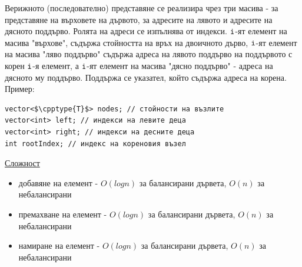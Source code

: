 \documentclass{article}
\begin{document}
Верижното (последователно) представяне се реализира чрез три масива - за представяне на върховете на
дървото, за адресите на лявото и адресите на дясното поддърво. Ролята на адреси се изпълнява от индекси. $\textcolor{black}{\texttt{i}}$-ят елемент на
масива "върхове", съдържа стойността на връх на двоичното дърво, $\textcolor{black}{\texttt{i}}$-ят елемент на масива "ляво поддърво" съдържа адреса на
лявото поддърво на поддървото с корен $\textcolor{black}{\texttt{i}}$-я елемент, а $\textcolor{black}{\texttt{i}}$-ят елемент на масива "дясно поддърво" - адреса на дясното му поддърво.
Поддържа се указател, който съдържа адреса на корена. \newline\newline Пример:
\begin{lstlisting}[style=cpp]
vector<$\cpptype{T}$> nodes; // стойности на възлите
vector<int> left; // индекси на левите деца
vector<int> right; // индекси на десните деца
int rootIndex; // индекс на кореновия възел
\end{lstlisting}
\underline{Сложност}
\begin{itemize}
    \item добавяне на елемент - $O(logn)$ за балансирани дървета, $O(n)$ за небалансирани
    \item премахване на елемент - $O(logn)$ за балансирани дървета, $O(n)$ за небалансирани
    \item намиране на елемент - $O(logn)$ за балансирани дървета, $O(n)$ за небалансирани
\end{itemize}
\end{document}
